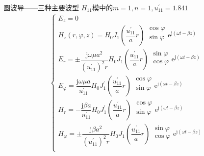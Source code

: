 \begin{frame}{圆波导——三种主要波型}
    $H_{11}$模中的$m=1,n=1,u_{11}^{'}=1.841$
    \begin{align*}
        \begin{cases}
            E_z=0                                     \\
            H_z(r,\varphi,z)=H_{0}J_1\left(\dfrac{u_{11}^{'}}{a}r\right)
            \begin{matrix*}
                \cos \varphi\\
                \sin \varphi\\
            \end{matrix*}
            \mathrm{e}^{\mathrm{j}(\omega t-\beta z)} \\
            E_r=\pm\dfrac{\mathrm{j}\omega\mu a^2}{(u_{11}^{'})^2r}H_{0}J_1\left(\dfrac{u_{11}^{'}}{a}r\right)
            \begin{matrix*}
                \sin \varphi\\
                \cos \varphi\\
            \end{matrix*}
            \mathrm{e}^{\mathrm{j}(\omega t-\beta z)} \\
            E_{\varphi}=\dfrac{\mathrm{j}\omega\mu a}{u_{11}^{'}}H_{0}J_1^{'}\left(\dfrac{u_{11}^{'}}{a}r\right)
            \begin{matrix*}
                \cos \varphi\\
                \sin \varphi\\
            \end{matrix*}
            \mathrm{e}^{\mathrm{j}(\omega t-\beta z)} \\
            H_r=-\dfrac{\mathrm{j}\beta a}{u_{11}^{'}}H_{0}J_1^{'}\left(\dfrac{u_{11}^{'}}{a}r\right)
            \begin{matrix*}
                \cos \varphi\\
                \sin \varphi\\
            \end{matrix*}
            \mathrm{e}^{\mathrm{j}(\omega t-\beta z)} \\
            H_{\varphi}=\pm\dfrac{\mathrm{j}\beta a^2}{(u_{11}^{'})^2r}H_{0}J_1\left(\dfrac{u_{11}^{'}}{a}r\right)
            \begin{matrix*}
                \sin \varphi\\
                \cos \varphi\\
            \end{matrix*}
            \mathrm{e}^{\mathrm{j}(\omega t-\beta z)} \\
        \end{cases}
    \end{align*}
\end{frame}

